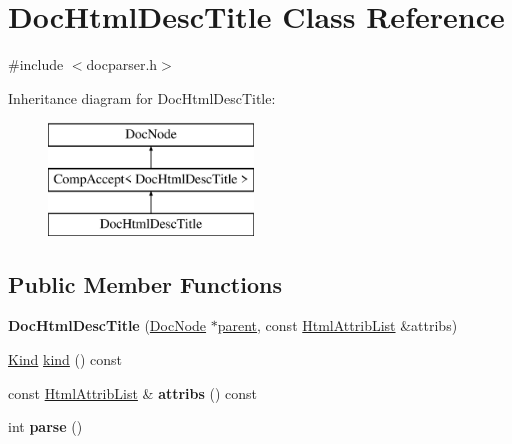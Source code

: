 \hypertarget{class_doc_html_desc_title}{}\section{Doc\+Html\+Desc\+Title Class Reference}
\label{class_doc_html_desc_title}


{\ttfamily \#include $<$docparser.\+h$>$}

Inheritance diagram for Doc\+Html\+Desc\+Title\+:\begin{figure}[H]
\begin{center}
\leavevmode
\includegraphics[height=3.000000cm]{class_doc_html_desc_title}
\end{center}
\end{figure}
\subsection*{Public Member Functions}
\begin{DoxyCompactItemize}
\item 
\mbox{\label{class_doc_html_desc_title_a1fb2e4eafa41ffce00f9be9c8979a5a3}} 
{\bfseries Doc\+Html\+Desc\+Title} (\mbox{\hyperlink{class_doc_node}{Doc\+Node}} $\ast$\mbox{\hyperlink{class_doc_node_a73e8ad29a91cfceb0968eb00db71a23d}{parent}}, const \mbox{\hyperlink{class_html_attrib_list}{Html\+Attrib\+List}} \&attribs)
\item 
\mbox{\hyperlink{class_doc_node_aebd16e89ca590d84cbd40543ea5faadb}{Kind}} \mbox{\hyperlink{class_doc_html_desc_title_add69ecdc619a8268bb8a7fa1a630f0dd}{kind}} () const
\item 
\mbox{\label{class_doc_html_desc_title_a4015547b3e52e58fb00899b42a1b7b95}} 
const \mbox{\hyperlink{class_html_attrib_list}{Html\+Attrib\+List}} \& {\bfseries attribs} () const
\item 
\mbox{\label{class_doc_html_desc_title_a2ca3a4d56f61574d9454cb2492fd3e58}} 
int {\bfseries parse} ()
\end{DoxyCompactItemize}
